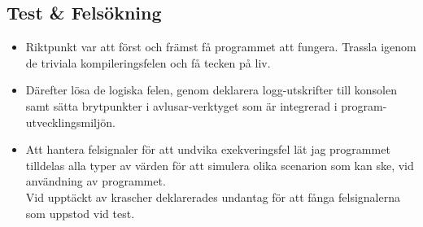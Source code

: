 \documentclass[../main.tex]{subfiles}
\begin{document}
\subsection{Test \& Felsökning}

\begin{tcolorbox}[colback=gray!5!white,colframe=black!75!black]

\begin{itemize}

    \item Riktpunkt var att först och främst få programmet att fungera. Trassla igenom de triviala kompileringsfelen och få tecken på liv.
    \item Därefter lösa de logiska felen, genom deklarera logg-utskrifter till konsolen samt sätta brytpunkter i avlusar-verktyget som är integrerad i program-utvecklingsmiljön.
    \item Att hantera felsignaler för att undvika exekveringsfel lät jag programmet tilldelas alla typer av värden för att simulera olika scenarion som kan ske, vid användning av programmet.\\ Vid upptäckt av krascher deklarerades undantag för att fånga felsignalerna som uppstod vid test.
    \end{itemize}
    
\end{tcolorbox}
\end{document}
